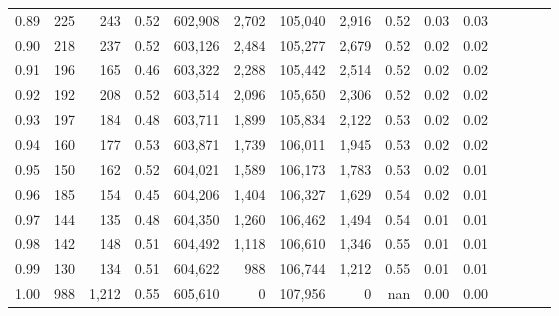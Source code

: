 \begin{tabular}{rrrcrrrrrrrrrrr}
0.89 &     225 &    243 &                                       0.52 &  602,908 &    2,702 &  105,040 &    2,916 &  0.52 &  0.03 &                         0.03 \\
0.90 &     218 &    237 &                                       0.52 &  603,126 &    2,484 &  105,277 &    2,679 &  0.52 &  0.02 &                         0.02 \\
0.91 &     196 &    165 &                                       0.46 &  603,322 &    2,288 &  105,442 &    2,514 &  0.52 &  0.02 &                         0.02 \\
0.92 &     192 &    208 &                                       0.52 &  603,514 &    2,096 &  105,650 &    2,306 &  0.52 &  0.02 &                         0.02 \\
0.93 &     197 &    184 &                                       0.48 &  603,711 &    1,899 &  105,834 &    2,122 &  0.53 &  0.02 &                         0.02 \\
0.94 &     160 &    177 &                                       0.53 &  603,871 &    1,739 &  106,011 &    1,945 &  0.53 &  0.02 &                         0.02 \\
0.95 &     150 &    162 &                                       0.52 &  604,021 &    1,589 &  106,173 &    1,783 &  0.53 &  0.02 &                         0.01 \\
0.96 &     185 &    154 &                                       0.45 &  604,206 &    1,404 &  106,327 &    1,629 &  0.54 &  0.02 &                         0.01 \\
0.97 &     144 &    135 &                                       0.48 &  604,350 &    1,260 &  106,462 &    1,494 &  0.54 &  0.01 &                         0.01 \\
0.98 &     142 &    148 &                                       0.51 &  604,492 &    1,118 &  106,610 &    1,346 &  0.55 &  0.01 &                         0.01 \\
0.99 &     130 &    134 &                                       0.51 &  604,622 &      988 &  106,744 &    1,212 &  0.55 &  0.01 &                         0.01 \\
1.00 &     988 &  1,212 &                                       0.55 &  605,610 &        0 &  107,956 &        0 &   nan &  0.00 &                         0.00 \\
\bottomrule
\end{tabular}
